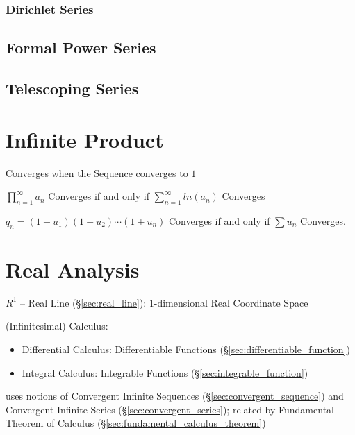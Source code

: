 


\subsubsection{Dirichlet Series}\label{sec:dirichlet_series}



\subsection{Formal Power Series}\label{sec:formal_power_series}

\subsection{Telescoping Series}\label{sec:telescoping_series}



\section{Infinite Product}\label{sec:infinite_product}

Converges when the Sequence converges to $1$

$\prod_{n=1}^\infty a_n$ Converges if and only if $\sum_{n=1}^\infty
ln(a_n)$ Converges

$q_n = (1 + u_1)(1 + u_2)\cdots(1 + u_n)$ Converges if and only if
$\sum u_n$ Converges.



\section{Real Analysis}\label{sec:real_analysis}

$R^1$ -- Real Line (\S\ref{sec:real_line}): 1-dimensional Real
Coordinate Space

(Infinitesimal) Calculus:
\begin{itemize}
\item Differential Calculus: Differentiable Functions
  (\S\ref{sec:differentiable_function})
\item Integral Calculus: Integrable Functions (\S\ref{sec:integrable_function})
\end{itemize}
uses notions of Convergent Infinite Sequences (\S\ref{sec:convergent_sequence})
and Convergent Infinite Series (\S\ref{sec:convergent_series}); related by
Fundamental Theorem of Calculus (\S\ref{sec:fundamental_calculus_theorem})

